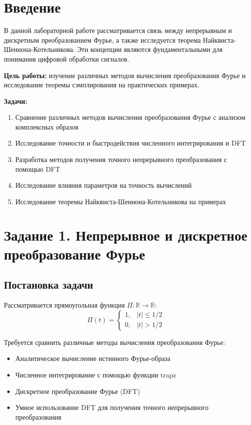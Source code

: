 \section*{Введение}

В данной лабораторной работе рассматривается связь между непрерывным и дискретным преобразованием Фурье, а также исследуется теорема Найквиста-Шеннона-Котельникова. Эти концепции являются фундаментальными для понимания цифровой обработки сигналов.

\textbf{Цель работы:} изучение различных методов вычисления преобразования Фурье и исследование теоремы сэмплирования на практических примерах.

\textbf{Задачи:}
\begin{enumerate}
    \item Сравнение различных методов вычисления преобразования Фурье с анализом комплексных образов
    \item Исследование точности и быстродействия численного интегрирования и DFT
    \item Разработка методов получения точного непрерывного преобразования с помощью DFT
    \item Исследование влияния параметров на точность вычислений
    \item Исследование теоремы Найквиста-Шеннона-Котельникова на примерах
\end{enumerate}

\section*{Задание 1. Непрерывное и дискретное преобразование Фурье}

\subsection*{Постановка задачи}

Рассматривается прямоугольная функция $\Pi: \mathbb{R} \to \mathbb{R}$:
\begin{equation}
\Pi(t) = \begin{cases}
1, & |t| \leq 1/2 \\
0, & |t| > 1/2
\end{cases}
\end{equation}

Требуется сравнить различные методы вычисления преобразования Фурье:
\begin{itemize}
    \item Аналитическое вычисление истинного Фурье-образа
    \item Численное интегрирование с помощью функции trapz
    \item Дискретное преобразование Фурье (DFT)
    \item Умное использование DFT для получения точного непрерывного преобразования
\end{itemize}

